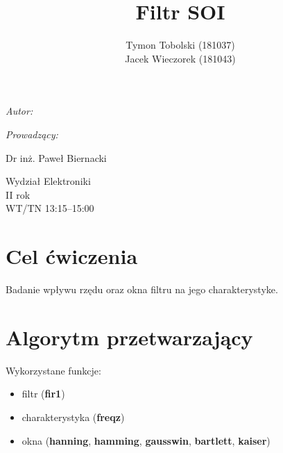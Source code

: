 \documentclass[wide,a4paper,titlepage,12pt]{mwart}
\title{Filtr SOI}
\author{Tymon Tobolski (181037)\\ Jacek Wieczorek (181043)}
\makeatletter
\renewcommand{\maketitle}{
\begin{titlepage}
  \begin{center}
    \vspace*{3cm}
    \LARGE \@title \par
    \vspace{2cm}
    \textit{\small Autor:}\par
    \normalsize \@author\par \normalsize
    \vspace{3cm}
    \textit{\small Prowadzący:}\par
    Dr inż. Paweł Biernacki \par
    \vspace{2cm}
    Wydział Elektroniki\\ II rok\\ WT/TN 13:15--15:00 \par
    \vspace{5cm}
    \small \@date
  \end{center}
\end{titlepage}
}
\makeatother
\begin{document}
  \maketitle
  \section{Cel ćwiczenia} %
  \label{sec:Cel}
    Badanie wpływu rzędu oraz okna filtru na jego charakterystyke.
    
  \section{Algorytm przetwarzający}
    Wykorzystane funkcje:
    \newline
    \begin{itemize}
      \item filtr (\textbf{fir1})
			\item charakterystyka (\textbf{freqz})
			\item okna (\textbf{hanning}, \textbf{hamming}, \textbf{gausswin}, \textbf{bartlett}, \textbf{kaiser})
    \end{itemize}
  
  \lstset{ %
    language=Octave,                %
    basicstyle=\scriptsize,       %
    numbers=left,                   %
    numberstyle=\scriptsize,      %
    stepnumber=10,                   %
    numbersep=9pt,                  %
    showspaces=false,               %
    showstringspaces=false,         %
    showtabs=false,                 %
    breaklines=true,                %
    }
    
    
\end{document}
